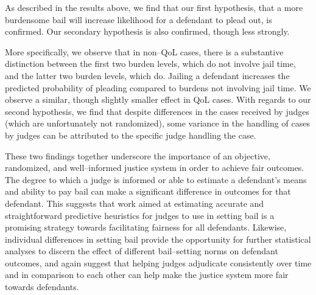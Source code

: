As described in the results above,
we find that our first hypothesis,
that a more burdensome bail will increase likelihood for a defendant to plead out,
is confirmed.
Our secondary hypothesis is also confirmed,
though less strongly.

More specifically,
we observe that in non--QoL cases,
there is a substantive distinction between the first two burden levels,
which do not involve jail time,
and the latter two burden levels,
which do.
Jailing a defendant
increases the predicted probability of pleading
compared to burdens not involving jail time.
We observe a similar,
though slightly smaller effect in QoL cases.
With regards to our second hypothesis,
we find that despite differences in the cases received by judges
(which are unfortunately not randomized),
some variance in the handling of cases by judges
can be attributed to the specific judge handling the case.


These two findings together underscore the importance of an objective,
randomized,
and well--informed justice system in order to achieve fair outcomes.
The degree to which a judge is informed or able to estimate
a defendant's means and ability to pay bail can
make a significant difference in outcomes for that defendant.
This suggests that work aimed at estimating
accurate and
straightforward predictive heuristics for judges to use in setting bail is
a promising strategy towards facilitating fairness for all defendants.
Likewise,
individual differences in setting bail provide the opportunity for
further statistical analyses to discern the effect of
different bail--setting norms on defendant outcomes,
and again suggest that helping judges adjudicate consistently over time and
in comparison to each other can
help make the justice system more fair towards defendants.